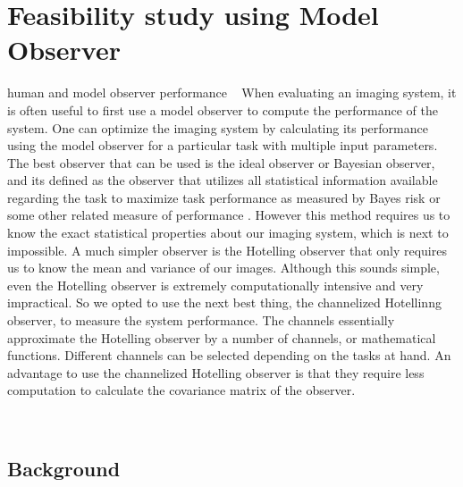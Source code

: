 \chapter{Feasibility study using Model Observer}
\label{chap:model_observer}

human and model observer performance ~\cite{Abbey2001}
When evaluating an imaging system, it is often useful to first use a model observer to compute the performance of the system.  One can optimize the imaging system by calculating its performance using the model observer for a particular task with multiple input parameters.  The best observer that can be used is the ideal observer or Bayesian observer, and its defined as the observer that utilizes all statistical information available regarding the task to maximize task performance as measured by Bayes risk or some other related measure of performance \citep{Barrett2004}.  However this method requires us to know the exact statistical properties about our imaging system, which is next to impossible.  A much simpler observer is the Hotelling observer that only requires us to know the mean and variance of our images.  Although this sounds simple, even the Hotelling observer is extremely computationally intensive and very impractical.  So we opted to use the next best thing, the channelized Hotellinng observer,  to measure the system performance.  
The channels essentially approximate the Hotelling observer by a number of channels, or mathematical functions.  Different channels can be selected depending on the tasks at hand.  An advantage to use the channelized Hotelling observer is that they require less computation to calculate the covariance matrix of the observer.

~\cite{Fan2010}
\citep{Barrett2004}

\section{Background}

